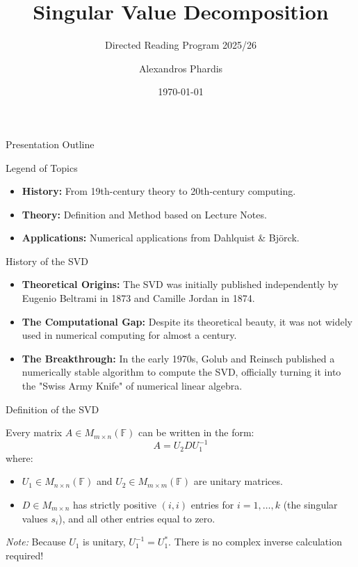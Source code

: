 \documentclass{beamer}
\title{Singular Value Decomposition}
\subtitle{Directed Reading Program 2025/26}
\author{Alexandros Phardis}
\date{\today}
\begin{document}
\begin{frame}
    \titlepage
\end{frame}

\begin{frame}{Presentation Outline}
    \begin{block}{Legend of Topics}
        \tableofcontents[hideallsubsections]
            \vspace{0.5cm}
            \begin{itemize}
        \item \textbf{History:} From 19th-century theory to 20th-century computing.
        \item \textbf{Theory:} Definition and Method based on Lecture Notes.
        \item \textbf{Applications:} Numerical applications from Dahlquist \& Björck.
    \end{itemize}
    \end{block}
    

    

\end{frame}

\begin{frame}{History of the SVD}
    \begin{itemize}
        \item \textbf{Theoretical Origins:} The SVD was initially published independently by Eugenio Beltrami in 1873 and Camille Jordan in 1874.
        \item \textbf{The Computational Gap:} Despite its theoretical beauty, it was not widely used in numerical computing for almost a century.
        \item \textbf{The Breakthrough:} In the early 1970s, Golub and Reinsch published a numerically stable algorithm to compute the SVD, officially turning it into the "Swiss Army Knife" of numerical linear algebra.
    \end{itemize}
\end{frame}

\begin{frame}{Definition of the SVD}
    \begin{theorem}
    Every matrix $A \in M_{m \times n}(\mathbb{F})$ can be written in the form:
    \[ A = U_2 D U_1^{-1} \]
    where:
    \begin{itemize}
        \item $U_1 \in M_{n \times n}(\mathbb{F})$ and $U_2 \in M_{m \times m}(\mathbb{F})$ are unitary matrices.
        \item $D \in M_{m \times n}$ has strictly positive $(i, i)$ entries for $i = 1, \dots, k$ (the singular values $s_i$), and all other entries equal to zero.
    \end{itemize}
    \end{theorem}
    \vspace{0.2cm}
    \textit{Note:} Because $U_1$ is unitary, $U_1^{-1} = U_1^*$. There is no complex inverse calculation required!
\end{frame}
\end{document}
